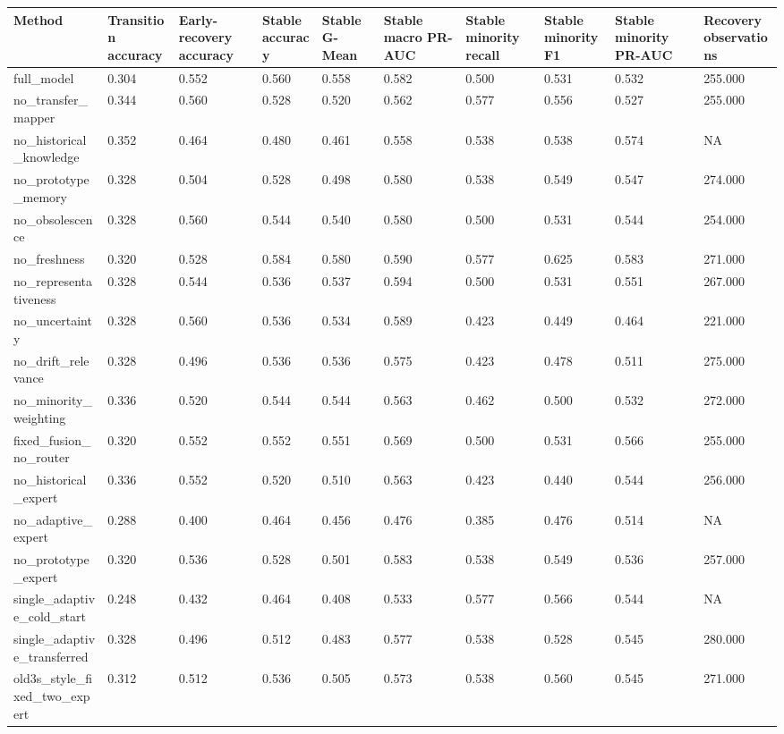 \begin{tabular}{llllllllll}
\toprule
Method & Transition accuracy & Early-recovery accuracy & Stable accuracy & Stable G-Mean & Stable macro PR-AUC & Stable minority recall & Stable minority F1 & Stable minority PR-AUC & Recovery observations \\
\midrule
full\_model & 0.304 & 0.552 & 0.560 & 0.558 & 0.582 & 0.500 & 0.531 & 0.532 & 255.000 \\
no\_transfer\_mapper & 0.344 & 0.560 & 0.528 & 0.520 & 0.562 & 0.577 & 0.556 & 0.527 & 255.000 \\
no\_historical\_knowledge & 0.352 & 0.464 & 0.480 & 0.461 & 0.558 & 0.538 & 0.538 & 0.574 & NA \\
no\_prototype\_memory & 0.328 & 0.504 & 0.528 & 0.498 & 0.580 & 0.538 & 0.549 & 0.547 & 274.000 \\
no\_obsolescence & 0.328 & 0.560 & 0.544 & 0.540 & 0.580 & 0.500 & 0.531 & 0.544 & 254.000 \\
no\_freshness & 0.320 & 0.528 & 0.584 & 0.580 & 0.590 & 0.577 & 0.625 & 0.583 & 271.000 \\
no\_representativeness & 0.328 & 0.544 & 0.536 & 0.537 & 0.594 & 0.500 & 0.531 & 0.551 & 267.000 \\
no\_uncertainty & 0.328 & 0.560 & 0.536 & 0.534 & 0.589 & 0.423 & 0.449 & 0.464 & 221.000 \\
no\_drift\_relevance & 0.328 & 0.496 & 0.536 & 0.536 & 0.575 & 0.423 & 0.478 & 0.511 & 275.000 \\
no\_minority\_weighting & 0.336 & 0.520 & 0.544 & 0.544 & 0.563 & 0.462 & 0.500 & 0.532 & 272.000 \\
fixed\_fusion\_no\_router & 0.320 & 0.552 & 0.552 & 0.551 & 0.569 & 0.500 & 0.531 & 0.566 & 255.000 \\
no\_historical\_expert & 0.336 & 0.552 & 0.520 & 0.510 & 0.563 & 0.423 & 0.440 & 0.544 & 256.000 \\
no\_adaptive\_expert & 0.288 & 0.400 & 0.464 & 0.456 & 0.476 & 0.385 & 0.476 & 0.514 & NA \\
no\_prototype\_expert & 0.320 & 0.536 & 0.528 & 0.501 & 0.583 & 0.538 & 0.549 & 0.536 & 257.000 \\
single\_adaptive\_cold\_start & 0.248 & 0.432 & 0.464 & 0.408 & 0.533 & 0.577 & 0.566 & 0.544 & NA \\
single\_adaptive\_transferred & 0.328 & 0.496 & 0.512 & 0.483 & 0.577 & 0.538 & 0.528 & 0.545 & 280.000 \\
old3s\_style\_fixed\_two\_expert & 0.312 & 0.512 & 0.536 & 0.505 & 0.573 & 0.538 & 0.560 & 0.545 & 271.000 \\
\bottomrule
\end{tabular}
